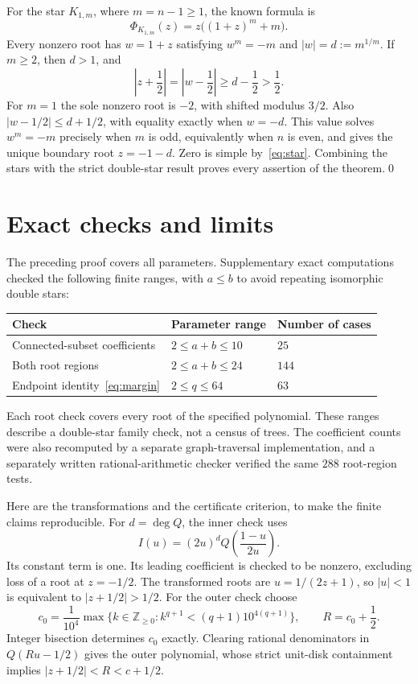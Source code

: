 \documentclass[11pt]{article}
\newcommand{\abs}[1]{\left|#1\right|}
\begin{document}
For the star $K_{1,m}$, where $m=n-1\geq1$, the known formula
\cite[Section~1]{BrownMol2020} is
\begin{equation}\label{eq:star}
 \Phi_{K_{1,m}}(z)=z\bigl((1+z)^m+m\bigr).
\end{equation}
Every nonzero root has $w=1+z$ satisfying $w^m=-m$ and
$|w|=d:=m^{1/m}$. If $m\geq2$, then $d>1$, and
\[
 \abs{z+\frac12}=\abs{w-\frac12}\geq d-\frac12>\frac12.
\]
For $m=1$ the sole nonzero root is $-2$, with shifted modulus $3/2$.
Also $|w-1/2|\leq d+1/2$, with equality exactly when $w=-d$.
This value solves $w^m=-m$ precisely when $m$ is odd, equivalently
when $n$ is even, and gives the unique boundary root $z=-1-d$.
Zero is simple by~\eqref{eq:star}. Combining the stars with the strict
double-star result proves every assertion of the theorem.\qed

\section{Exact checks and limits}

The preceding proof covers all parameters. Supplementary exact
computations checked the following finite ranges, with $a\leq b$ to
avoid repeating isomorphic double stars:
\begin{center}
\begin{tabular}{@{}lll@{}}
\toprule
Check & Parameter range & Number of cases\\
\midrule
Connected-subset coefficients & $2\leq a+b\leq10$ & $25$\\
Both root regions & $2\leq a+b\leq24$ & $144$\\
Endpoint identity~\eqref{eq:margin} & $2\leq q\leq64$ & $63$\\
\bottomrule
\end{tabular}
\end{center}
Each root check covers every root of the specified polynomial.
These ranges describe a double-star family check, not a census of trees.
The coefficient counts were also recomputed by a separate graph-traversal
implementation, and a separately written rational-arithmetic checker
verified the same $288$ root-region tests.

Here are the transformations and the certificate criterion, to make
the finite claims reproducible. For $d=\deg Q$, the inner check uses
\begin{equation}\label{eq:innertransform}
 I(u)=(2u)^d Q\left(\frac{1-u}{2u}\right).
\end{equation}
Its constant term is one. Its leading coefficient is checked to be
nonzero, excluding loss of a root at $z=-1/2$.
The transformed roots are $u=1/(2z+1)$, so $|u|<1$ is equivalent to
$|z+1/2|>1/2$. For the outer check choose
\[
 c_0=\frac{1}{10^4}\max\{k\in\mathbb Z_{\geq0}:
            k^{q+1}<(q+1)10^{4(q+1)}\},\qquad R=c_0+\frac12.
\]
Integer bisection determines $c_0$ exactly. Clearing rational
denominators in $Q(Ru-1/2)$ gives the outer polynomial, whose strict
unit-disk containment implies $|z+1/2|<R<c+1/2$.
\end{document}
